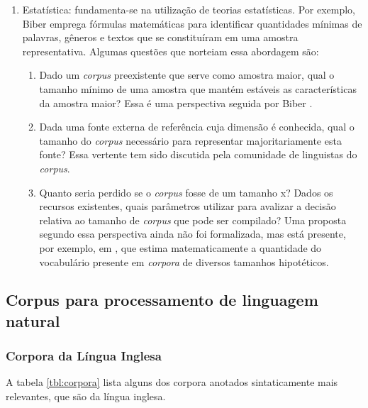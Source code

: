 \begin{enumerate}
\item Estatística: fundamenta-se na utilização de teorias estatísticas. Por exemplo, Biber \cite{biber93} emprega fórmulas matemáticas para identificar quantidades mínimas de palavras, gêneros e textos que se constituíram em uma amostra representativa. Algumas questões que norteiam essa abordagem são:

\begin{enumerate}
\item Dado um \emph{corpus} preexistente que serve como amostra maior, qual o tamanho mínimo de uma amostra que mantém estáveis as características da amostra maior? Essa é uma perspectiva seguida por Biber \cite{biber90,biber93}.

\item Dada uma fonte externa de referência cuja dimensão é conhecida, qual o tamanho do \emph{corpus} necessário para representar majoritariamente esta fonte? Essa vertente tem sido discutida pela comunidade de linguistas do \emph{corpus}.

\item Quanto seria perdido se o \emph{corpus} fosse de um tamanho x? Dados os recursos existentes, quais parâmetros utilizar para avalizar a decisão relativa ao tamanho de \emph{corpus} que pode ser compilado? Uma proposta segundo essa perspectiva ainda não foi formalizada, mas está presente, por exemplo, em \cite{cantossanches97.2,cantossanchez97}, que estima matematicamente a quantidade do vocabulário presente em \emph{corpora} de diversos tamanhos hipotéticos.
\end{enumerate}

\end{enumerate}

\newpage

\subsection{Corpus para processamento de linguagem natural} %
\label{sub:corpus_pln}


\subsubsection{Corpora da Língua Inglesa}
\label{sub:corpus_ingles}

A tabela \ref{tbl:corpora} lista alguns dos corpora anotados sintaticamente mais relevantes, que são da língua inglesa.

